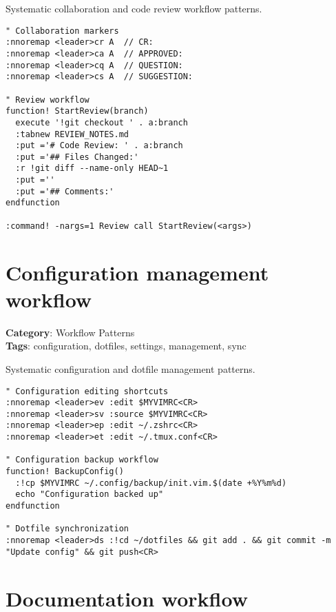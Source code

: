 {{{{{{{{{{{{{{{{{{{Systematic collaboration and code review workflow patterns.

\begin{Exa*}{}
\begin{Verbatim}[fontsize=\footnotesize, breaklines, breakanywhere]
" Collaboration markers
:nnoremap <leader>cr A  // CR: 
:nnoremap <leader>ca A  // APPROVED: 
:nnoremap <leader>cq A  // QUESTION: 
:nnoremap <leader>cs A  // SUGGESTION: 

" Review workflow
function! StartReview(branch)
  execute '!git checkout ' . a:branch
  :tabnew REVIEW_NOTES.md
  :put ='# Code Review: ' . a:branch
  :put ='## Files Changed:'
  :r !git diff --name-only HEAD~1
  :put =''
  :put ='## Comments:'
endfunction

:command! -nargs=1 Review call StartReview(<args>)
\end{Verbatim}
\end{Exa*}

\section{Configuration management workflow}

\textbf{Category}: Workflow Patterns\\ \textbf{Tags}: configuration, dotfiles, settings, management, sync
\vspace{0.5cm}

Systematic configuration and dotfile management patterns.

\begin{Exa*}{}
\begin{Verbatim}[fontsize=\footnotesize, breaklines, breakanywhere]
" Configuration editing shortcuts  
:nnoremap <leader>ev :edit $MYVIMRC<CR>
:nnoremap <leader>sv :source $MYVIMRC<CR>
:nnoremap <leader>ep :edit ~/.zshrc<CR>
:nnoremap <leader>et :edit ~/.tmux.conf<CR>

" Configuration backup workflow
function! BackupConfig()
  :!cp $MYVIMRC ~/.config/backup/init.vim.$(date +%Y%m%d)
  echo "Configuration backed up"
endfunction

" Dotfile synchronization
:nnoremap <leader>ds :!cd ~/dotfiles && git add . && git commit -m "Update config" && git push<CR>
\end{Verbatim}
\end{Exa*}

\section{Documentation workflow}

}}}}}}}}}}}}}}}}}}}
